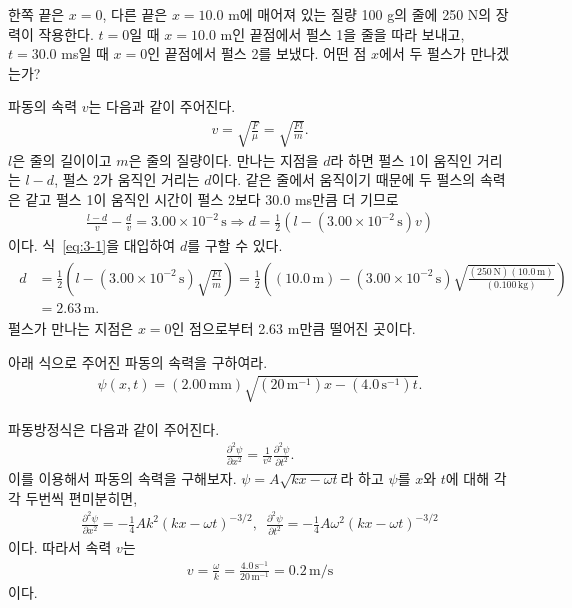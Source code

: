 \documentclass[floatfix,nofootinbib,superscriptaddress,fleqn]{revtex4-2}
\begin{document}
\vspace{1.cm}

한쪽 끝은 $x=0$, 다른 끝은 $x=10.0$ m에 매어져 있는 질량 100 g의 줄에
250 N의 장력이 작용한다. $t=0$일 때 $x=10.0$ m인 끝점에서 펄스 1을
줄을 따라 보내고, $t=30.0$ ms일 때 $x=0$인 끝점에서 펄스 2를
보냈다. 어떤 점 $x$에서 두 펄스가 만나겠는가? 

\vspace{1.cm}
파동의 속력 $v$는 다음과 같이 주어진다.
\begin{align}\label{eq:3-1}
  v = \sqrt{\frac{F}{\mu}}=\sqrt{\frac{Fl}{m}}.
\end{align}
$l$은 줄의 길이이고 $m$은 줄의 질량이다.
만나는 지점을 $d$라 하면 펄스 1이 움직인 거리는 $l-d$, 펄스 2가 움직인 거리는 $d$이다.
같은 줄에서 움직이기 때문에 두 펄스의 속력은 같고 펄스 1이 움직인 시간이 펄스 2보다 30.0 ms만큼 
더 기므로
\begin{align}
  \frac{l-d}{v}-\frac{d}{v} = 3.00\times 10^{-2}\,\mathrm{s}
  \Longrightarrow d=\frac{1}{2}(l-(3.00\times 10^{-2}\,\mathrm{s})v) 
\end{align}
이다. 식~\eqref{eq:3-1}을 대입하여 $d$를 구할 수 있다.
\begin{align}
  \begin{split}
    d &=\frac{1}{2}\left(l-(3.00\times 10^{-2}\,\mathrm{s})\sqrt{\frac{Fl}{m}}\right) 
    =\frac{1}{2}\left((10.0\,\mathrm{m})-(3.00\times 10^{-2}\,\mathrm{s})
    \sqrt{\frac{(250\,\mathrm{N})(10.0\,\mathrm{m})}{(0.100\,\mathrm{kg})}}\right)  \\
    &= 2.63\,\mathrm{m}.
  \end{split}
\end{align}
펄스가 만나는 지점은 $x=0$인 점으로부터 2.63 m만큼 떨어진 곳이다.

\vspace{1.cm}

아래 식으로 주어진 파동의 속력을 구하여라.
\begin{align}
  \label{eq:4}
\psi(x,t) = (2.00\,\mathrm{mm}) \sqrt{(20\,\mathrm{m}^{-1}) x - (4.0
  \,\mathrm{s}^{-1})t} .
\end{align}

\vspace{1.cm}
파동방정식은 다음과 같이 주어진다.
\begin{align}
  \frac{\partial^2 \psi}{\partial x^2} =\frac{1}{v^2}\frac{\partial^2 \psi}{\partial t^2}.
\end{align}
이를 이용해서 파동의 속력을 구해보자. 
$\psi = A\sqrt{kx-\omega t}$라 하고
$\psi$를 $x$와 $t$에 대해 각각 두번씩 편미분히면,
\begin{align}
  \frac{\partial^2 \psi}{\partial x^2}= -\frac{1}{4}Ak^2(kx-\omega t)^{-3/2},\,\,\,
  \frac{\partial^2 \psi}{\partial t^2}= -\frac{1}{4}A\omega^2(kx-\omega t)^{-3/2}
\end{align}
이다. 따라서 속력 $v$는
\begin{align}
  v = \frac{\omega}{k} = \frac{4.0\,\mathrm{s}^{-1}}{20\,\mathrm{m}^{-1}}
  = 0.2\,\mathrm{m/s}
\end{align}
이다.
\vspace{1.cm}
\end{document}
